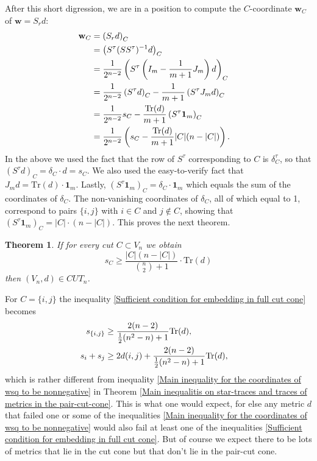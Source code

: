 \documentclass[12pt]{amsart}
\newtheorem{theorem}{Theorem}
\numberwithin{theorem}{section}
\theoremstyle{remark}
\begin{document}
After this short digression, we are in a position to compute the $C$-coordinate $\mathbf{w}_C$ of $\mathbf w = S_rd$:
\begin{align} \label{Coordinates of the particular solution of the full cut matrix}
\mathbf w_C & = \left( S_r d\right)_C \cr 
& = \left( S^\tau (SS^\tau)^{-1} d\right)_C \cr
& = \frac{1}{2^{n-2}} \left( S^\tau \left(I_m - \frac{1}{m+1}J_m \right)  d\right)_C \cr
& = \frac{1}{2^{n-2}} \left( S^\tau d\right)_C - \frac{1}{m+1}  \left(S^\tau J_m d \right)_C \cr
& = \frac{1}{2^{n-2}} s_C - \frac{\text{Tr}(d)}{m+1}  \left(S^\tau \mathbf{1}_m \right)_C \cr
& = \frac{1}{2^{n-2}} \left( s_C - \frac{\text{Tr}(d)}{m+1} |C|(n-|C|) \right).
\end{align}
In the above we used the fact that the row of $S^\tau$ corresponding to $C$ is $\delta_C^\tau$, so that $(S^\tau d)_C = \delta_C\cdot d = s_C$. We also used the easy-to-verify fact that $J_md = \text{Tr}(d) \cdot \mathbf{1}_m$. Lastly, $(S^\tau \mathbf{1}_m)_C = \delta_C\cdot \mathbf{1}_m$ which equals the sum of the coordinates of $\delta_C$. The non-vanishing coordinates of $\delta_C$, all of which equal to 1, correspond to pairs $\{i,j\}$ with $i\in C$ and $j\notin C$, showing that $(S^\tau \mathbf{1}_m)_C = |C|\cdot(n-|C|)$. This proves the next theorem.
\vskip3mm
\begin{theorem} \label{Main theorem for the full cut matrix and inequalities for a metric to lie in the full cut cone}
If for every cut $C\subset V_n$ we obtain 
\begin{equation} \label{Sufficient condition for embedding in full cut cone}
s_C \ge \frac{|C|(n-|C|)}{{n\choose 2} + 1} \cdot \text{Tr}(d)	
\end{equation} 
then $(V_n,d)\in CUT_n$. 
\end{theorem}
For $C=\{i,j\}$ the inequality \eqref{Sufficient condition for embedding in full cut cone} becomes 
\begin{align*}
s_{\{i,j\}} & \ge \frac{2(n-2)}{\frac{1}{2}(n^2-n)+1} \text{Tr}(d), \cr
s_i+s_j &\ge 2d(i,j) + \frac{2(n-2)}{\frac{1}{2}(n^2-n)+1} \text{Tr}(d), 
\end{align*} 
which is rather different from inequality \eqref{Main inequality for the coordinates of wsq to be nonnegative} in Theorem \ref{Main inequalitis on star-traces and traces of metrics in the pair-cut-cone}. This is what one would expect, for else any metric $d$ that failed one or some of the inequalities \eqref{Main inequality for the coordinates of wsq to be nonnegative} would also fail at least one of the inequalities \eqref{Sufficient condition for embedding in full cut cone}. But of course we expect there to be lots of metrics that lie in the cut cone but that don't lie in the pair-cut cone. 
\end{document}
